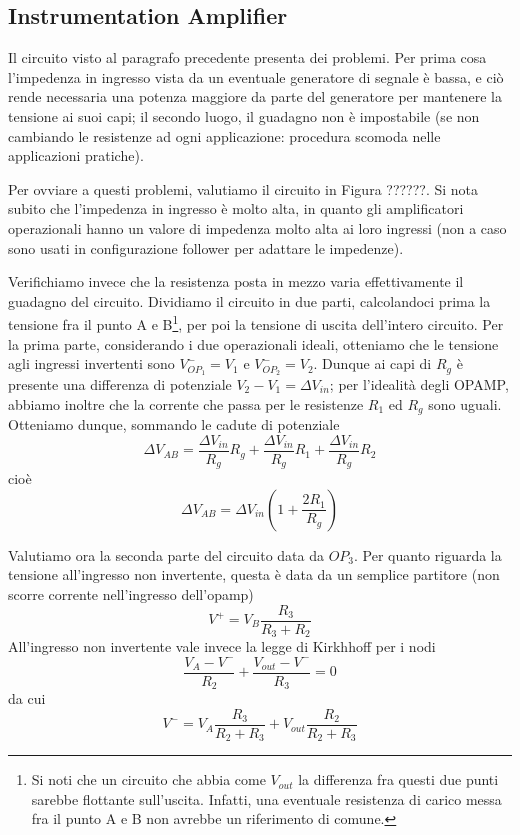 \subsection{Instrumentation Amplifier}

Il circuito visto al paragrafo precedente presenta dei problemi. Per prima cosa l'impedenza in ingresso vista da un eventuale generatore di segnale è bassa, e ciò rende necessaria una potenza maggiore da parte del generatore per mantenere la tensione ai suoi capi; il secondo luogo, il guadagno non è impostabile (se non cambiando le resistenze ad ogni applicazione: procedura scomoda nelle applicazioni pratiche).

Per ovviare a questi problemi, valutiamo il circuito in Figura ??????. Si nota subito che l'impedenza in ingresso è molto alta, in quanto gli amplificatori operazionali hanno un valore di impedenza molto alta ai loro ingressi (non a caso sono usati in configurazione follower per adattare le impedenze).

Verifichiamo invece che la resistenza posta in mezzo varia effettivamente il guadagno del circuito. Dividiamo il circuito in due parti, calcolandoci prima la tensione fra il punto A e B\footnote{Si noti che un circuito che abbia come $V_{out}$ la differenza fra questi due punti sarebbe flottante sull'uscita. Infatti, una eventuale resistenza di carico messa fra il punto A e B non avrebbe un riferimento di comune.}, per poi la tensione di uscita dell'intero circuito. Per la prima parte, considerando i due operazionali ideali, otteniamo che le tensione agli ingressi invertenti sono $V_{OP_1}^- = V_1$ e $V_{OP_2}^- = V_2$. Dunque ai capi di $R_g$ è presente una differenza di potenziale $V_2-V_1 = \Delta V_{in}$; per l'idealità degli OPAMP, abbiamo inoltre che la corrente che passa per le resistenze $R_1$ ed $R_g$ sono uguali. Otteniamo dunque, sommando le cadute di potenziale
$$\Delta V_{AB} = \frac{\Delta V_{in}}{R_g} R_g + \frac{\Delta V_{in}}{R_g} R_1 + \frac{\Delta V_{in}}{R_g} R_2$$
cioè
\begin{equation}
\Delta V_{AB} = \Delta V_{in} \left(1+\frac{2R_1}{R_g}\right)
\label{eq5:TEMP_calcoli}
\end{equation}

Valutiamo ora la seconda parte del circuito data da $OP_3$. Per quanto riguarda la tensione all'ingresso non invertente, questa è data da un semplice partitore (non scorre corrente nell'ingresso dell'opamp)
$$V^+=V_B \frac{R_3}{R_3+R_2}$$
All'ingresso non invertente vale invece la legge di Kirkhhoff per i nodi
$$\frac{V_A-V^-}{R_2}+\frac{V_{out}-V^-}{R_3}=0$$
da cui
$$V^-=V_A \frac{R_3}{R_2+R_3} + V_{out} \frac{R_2}{R_2+R_3}$$

